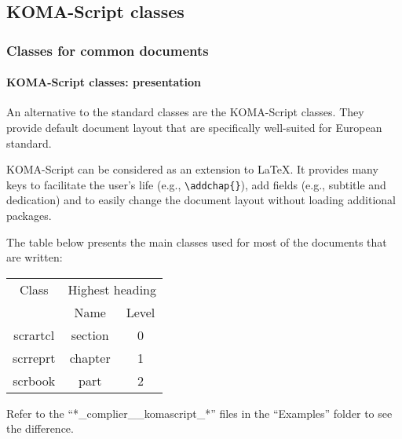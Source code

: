 \documentclass[11pt]{beamer}
\begin{document}
	\subsection{KOMA-Script classes}


\begin{frame}[fragile]
	\frametitle{Classes for common documents}
	\framesubtitle{KOMA-Script classes: presentation}
	
	An alternative to the standard classes are the KOMA-Script classes.
	They provide default document layout that are specifically well-suited for European standard.
	
	KOMA-Script can be considered as an extension to \LaTeX{}.
	It provides many keys to facilitate the user's life (e.g., \verb|\addchap{}|), add fields (e.g., subtitle and dedication) and to easily change the document layout without loading additional packages.
	
	The table below presents the main classes used for most of the documents that are written:
	\begin{table}[h]
		\begin{tabular}{*{3}{c}}
			\toprule
			    Class      & \multicolumn{2}{c}{Highest heading} \\
			\cmidrule{2-3} &  Name   &           Level           \\ \midrule
			   scrartcl    & section &             0             \\
			   scrreprt    & chapter &             1             \\
			   scrbook     &  part   &             2             \\ \bottomrule
		\end{tabular}
	\end{table}
	Refer to the \enquote{*\_complier\_\_komascript\_*} files in the \enquote{Examples} folder to see the difference.
\end{frame}
\end{document}
